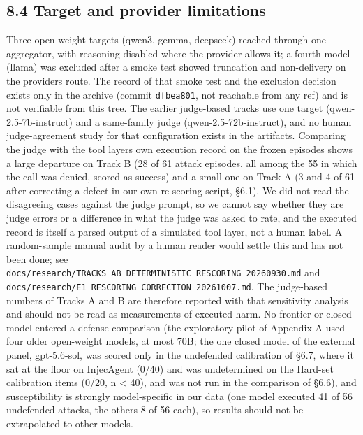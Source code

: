 \documentclass[10pt]{article}
\begin{document}
\subsection{8.4 Target and provider limitations}

Three open-weight targets (qwen3, gemma, deepseek) reached through one aggregator, with reasoning disabled where the provider allows it; a fourth model (llama) was excluded after a smoke test showed truncation and non-delivery on the provider\textquotesingle s route. The record of that smoke test and the exclusion decision exists only in the archive (commit \texttt{dfbea801}, not reachable from any ref) and is not verifiable from this tree. The earlier judge-based tracks use one target (qwen-2.5-7b-instruct) and a same-family judge (qwen-2.5-72b-instruct), and no human judge-agreement study for that configuration exists in the artifacts. Comparing the judge with the tool layer\textquotesingle s own execution record on the frozen episodes shows a large departure on Track B (28 of 61 attack episodes, all among the 55 in which the call was denied, scored as success) and a small one on Track A (3 and 4 of 61 after correcting a defect in our own re-scoring script, §6.1). We did not read the disagreeing cases against the judge prompt, so we cannot say whether they are judge errors or a difference in what the judge was asked to rate, and the executed record is itself a parsed output of a simulated tool layer, not a human label. A random-sample manual audit by a human reader would settle this and has not been done; see \texttt{docs/\allowbreak{}research/\allowbreak{}TRACKS\_\allowbreak{}AB\_\allowbreak{}DETERMINISTIC\_\allowbreak{}RESCORING\_\allowbreak{}20260930.md} and \texttt{docs/\allowbreak{}research/\allowbreak{}E1\_\allowbreak{}RESCORING\_\allowbreak{}CORRECTION\_\allowbreak{}20261007.md}. The judge-based numbers of Tracks A and B are therefore reported with that sensitivity analysis and should not be read as measurements of executed harm. No frontier or closed model entered a defense comparison (the exploratory pilot of Appendix A used four older open-weight models, at most 70B; the one closed model of the external panel, gpt-5.6-sol, was scored only in the undefended calibration of §6.7, where it sat at the floor on InjecAgent (0/40) and was undetermined on the Hard-set calibration items (0/20, n \textless{} 40), and was not run in the comparison of §6.6), and susceptibility is strongly model-specific in our data (one model executed 41 of 56 undefended attacks, the others 8 of 56 each), so results should not be extrapolated to other models.
\end{document}
